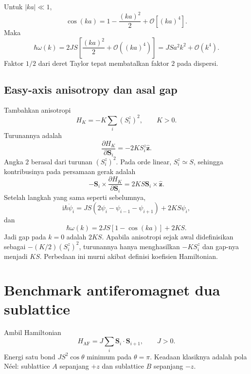 \documentclass[11pt,a4paper]{article}
\newcommand{\ii}{\mathrm{i}}
\newcommand{\vS}{\bm S}
\begin{document}
Untuk $|ka|\ll1$,
\begin{equation}
\cos(ka)=1-\frac{(ka)^2}{2}+\mathcal O[(ka)^4].
\end{equation}
Maka
\begin{equation}
\hbar\omega(k)
=2JS\left[\frac{(ka)^2}{2}+\mathcal O((ka)^4)\right]
=JSa^2k^2+\mathcal O(k^4).
\label{eq:fm-longwave}
\end{equation}
Faktor $1/2$ dari deret Taylor tepat membatalkan faktor $2$ pada dispersi.

\subsection{Easy-axis anisotropy dan asal gap}

Tambahkan anisotropi
\begin{equation}
H_K=-K\sum_i(S_i^z)^2,
\qquad K>0.
\end{equation}
Turunannya adalah
\begin{equation}
\frac{\partial H_K}{\partial\vS_i}
=-2KS_i^z\widehat{\bm z}.
\end{equation}
Angka $2$ berasal dari turunan $(S_i^z)^2$. Pada orde linear, $S_i^z\simeq S$, sehingga kontribusinya pada persamaan gerak adalah
\begin{equation}
-\vS_i\times\frac{\partial H_K}{\partial\vS_i}
=2KS\vS_i\times\widehat{\bm z}.
\end{equation}
Setelah langkah yang sama seperti sebelumnya,
\begin{equation}
\ii\hbar\dot\psi_i
=JS(2\psi_i-\psi_{i-1}-\psi_{i+1})+2KS\psi_i,
\end{equation}
dan
\begin{equation}
\boxed{\hbar\omega(k)=2JS[1-\cos(ka)]+2KS.}
\label{eq:fm-anisotropy-dispersion}
\end{equation}
Jadi gap pada $k=0$ adalah $2KS$. Apabila anisotropi sejak awal didefinisikan sebagai $-(K/2)(S_i^z)^2$, turunannya hanya menghasilkan $-KS_i^z$ dan gap-nya menjadi $KS$. Perbedaan ini murni akibat definisi koefisien Hamiltonian.

\section{Benchmark antiferomagnet dua sublattice}

Ambil Hamiltonian
\begin{equation}
H_{\mathrm{AF}}=J\sum_i\vS_i\cdot\vS_{i+1},
\qquad J>0.
\end{equation}
Energi satu bond $JS^2\cos\theta$ minimum pada $\theta=\pi$. Keadaan klasiknya adalah pola N\'eel: sublattice $A$ sepanjang $+z$ dan sublattice $B$ sepanjang $-z$.
\end{document}
